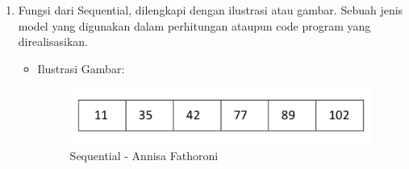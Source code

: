 \begin{enumerate}
\begin{enumerate}
\begin{itemize}
\end{itemize}
\end{enumerate}

\item Fungsi dari Sequential, dilengkapi dengan ilustrasi atau gambar.
Sebuah jenis model yang digunakan dalam perhitungan ataupun code program yang direalisasikan.
\begin{itemize}
\item Ilustrasi Gambar:

\begin{figure}[!hbtp]
\centering
\includegraphics[scale=0.7]{figures/Chapter6AnnisaFathoroni8.png}
\caption{Sequential - Annisa Fathoroni}
\label{Sequential - Annisa Fathoroni}
\end{figure}

\end{itemize}
\end{enumerate}